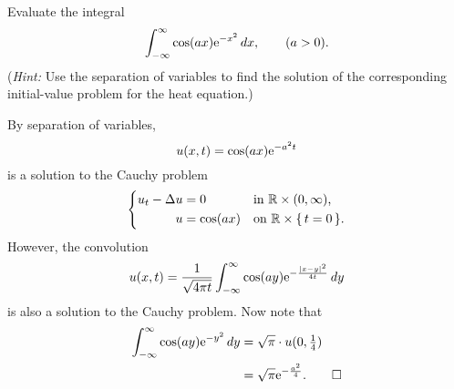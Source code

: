 \begin{problem}
  Evaluate the integral
  \[
    \int_{-\infty}^\infty \cos(ax)\mathrm{e}^{-x^2}\mathop{}\!d x,\qquad (a>0).
  \]
  \noindent (\emph{Hint:} Use the separation of variables to find the
  solution of the corresponding initial-value problem for the heat
  equation.)
\end{problem}
\begin{solution}
  By separation of variables,
  \[
    u(x,t)=\cos(ax)\mathrm{e}^{-a^2t}
  \]
  is a solution to the Cauchy problem
  \[
    \left\{
      \begin{aligned}
        u_t-\Delta u&=0&&\text{in \(\mathbb{R}\times(0,\infty)\),}\\
        u&=\cos(ax)&&\text{on \(\mathbb{R}\times\{\,t=0\,\}\).}
      \end{aligned}
    \right.
  \]
  However, the convolution
  \[
    u(x,t)=%
    \frac{1}{\sqrt{4\pi t}}\int_{-\infty}^\infty%
    \cos(a y)\rme^{-\frac{|x-y|^2}{4t}}\diff y
  \]
  is also a solution to the Cauchy problem. Now note that
  \begin{align*}
    \int_{-\infty}^\infty\cos(ay)\mathrm{e}^{-y^2}\mathop{}\!d y
    &=\sqrt{\pi}\cdot u(0,\tfrac{1}{4})\\
    &=\sqrt{\pi}\mathrm{e}^{-\frac{a^2}{4}}.\qedhere
  \end{align*}
\end{solution}


